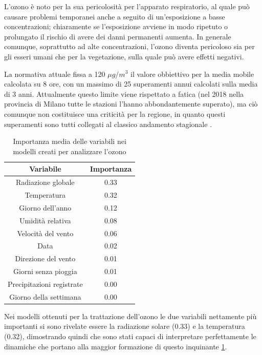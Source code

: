 \documentclass[a4paper]{report}
\begin{document}
L'ozono è noto per la sua pericolosità per l'apparato respiratorio, al quale può causare problemi temporanei anche a seguito di un'esposizione a basse concentrazioni; chiaramente se l'esposizione avviene in modo ripetuto o prolungato il rischio di avere dei danni permanenti aumenta. In generale comunque, soprattutto ad alte concentrazioni, l'ozono diventa pericoloso sia per gli esseri umani che per la vegetazione, sulla quale può avere effetti negativi.

La normativa attuale fissa a 120 $\mu g/m^3$ il valore obbiettivo per la media mobile calcolata su 8 ore, con un massimo di 25 superamenti annui calcolati sulla media di 3 anni. Attualmente questo limite viene rispettato a fatica (nel 2018 nella provincia di Milano tutte le stazioni l'hanno abbondantemente superato), ma ciò comunque non costituisce una criticità per la regione, in quanto questi superamenti sono tutti collegati al classico andamento stagionale \cite{arpa2018rapporto}.

\begin{table}[h!]
\centering
\begin{tabular}{ |c c| }
	\hline
	Variabile & Importanza \\
	\hline
	Radiazione globale & 0.33 \\
	Temperatura & 0.32 \\
	Giorno dell'anno & 0.12 \\
	Umidità relativa & 0.08 \\
	Velocità del vento & 0.06 \\
	Data & 0.02 \\
	Direzione del vento & 0.01 \\
	Giorni senza pioggia & 0.01 \\
	Precipitazioni registrate & 0.00 \\
	Giorno della settimana & 0.00 \\
	\hline
\end{tabular}
\caption{Importanza media delle variabili nei modelli creati per analizzare l'ozono}
\label{table:importanza_o3}
\end{table}

Nei modelli ottenuti per la trattazione dell'ozono le due variabili nettamente più importanti si sono rivelate essere la radiazione solare (0.33) e la temperatura (0.32), dimostrando quindi che sono stati capaci di interpretare perfettamente le dinamiche che portano alla maggior formazione di questo inquinante \ref{table:importanza_o3}.
\end{document}
